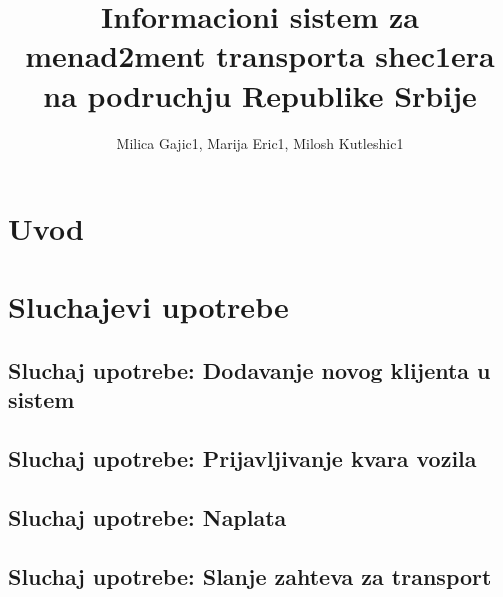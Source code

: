 \documentclass{article}
\title{Informacioni sistem za menad2ment transporta shec1era na podruchju Republike Srbije}
\author{Milica Gajic1, Marija Eric1, Milosh Kutleshic1}
\begin{document}
\maketitle
\newpage


\renewcommand*\contentsname{Sadrz1aj}
\tableofcontents
\newpage

\section{Uvod}

\section{Sluchajevi upotrebe}
\subsection{Sluchaj upotrebe: Dodavanje novog klijenta u sistem}


\subsection{Sluchaj upotrebe: Prijavljivanje kvara vozila}

\subsection{Sluchaj upotrebe: Naplata}


\subsection{Sluchaj upotrebe: Slanje zahteva za transport}


\nocite{*}
\selectfont



\end{document}
